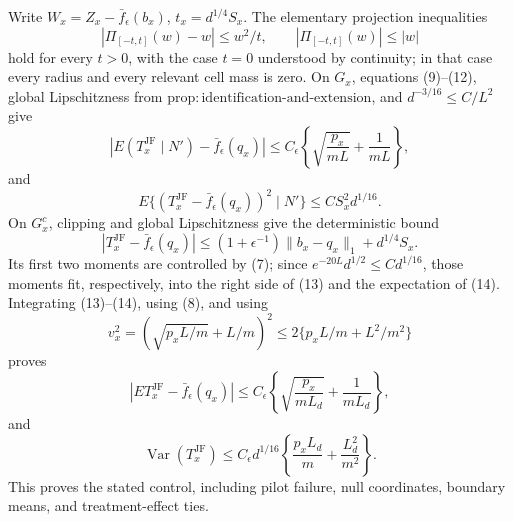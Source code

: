 Write \(W_x=Z_x-\bar f_\epsilon(b_x)\), \(t_x=d^{1/4}S_x\).  The elementary projection inequalities
\[
 |\Pi_{[-t,t]}(w)-w|\leq w^2/t,
 \qquad |\Pi_{[-t,t]}(w)|\leq|w|                                  \tag{12}
\]
hold for every \(t>0\), with the case \(t=0\) understood by continuity; in that case every radius and every relevant cell mass is zero.  On \(G_x\), equations (9)--(12), global Lipschitzness from \(\mathrm{prop:identification\mbox{-}and\mbox{-}extension}\), and \(d^{-3/16}\leq C/L^2\) give
\[
 |E(T_x^{\mathrm{JF}}\mid N')-\bar f_\epsilon(q_x)|
 \leq C_\epsilon\left\{
 \sqrt{\frac{p_x}{mL}}+\frac1{mL}\right\},                       \tag{13}
\]
and
\[
 E\{(T_x^{\mathrm{JF}}-\bar f_\epsilon(q_x))^2\mid N'\}
 \leq CS_x^2d^{1/16}.                                               \tag{14}
\]
On \(G_x^c\), clipping and global Lipschitzness give the deterministic bound
\[
 |T_x^{\mathrm{JF}}-\bar f_\epsilon(q_x)|
 \leq(1+\epsilon^{-1})\lVert b_x-q_x\rVert_1+d^{1/4}S_x.
\]
Its first two moments are controlled by (7); since \(e^{-20L}d^{1/2}\leq Cd^{1/16}\), those moments fit, respectively, into the right side of (13) and the expectation of (14).  Integrating (13)--(14), using (8), and using
\[
 v_x^2=(\sqrt{p_xL/m}+L/m)^2
 \leq2\{p_xL/m+L^2/m^2\}
\]
proves
\[
 |E T_x^{\mathrm{JF}}-\bar f_\epsilon(q_x)|
 \leq C_\epsilon\left\{\sqrt{\frac{p_x}{mL_d}}+\frac1{mL_d}\right\},
\]
and
\[
 \operatorname{Var}(T_x^{\mathrm{JF}})
 \leq C_\epsilon d^{1/16}
 \left\{\frac{p_xL_d}{m}+\frac{L_d^2}{m^2}\right\}.
\]
This proves the stated control, including pilot failure, null coordinates, boundary means, and treatment-effect ties.